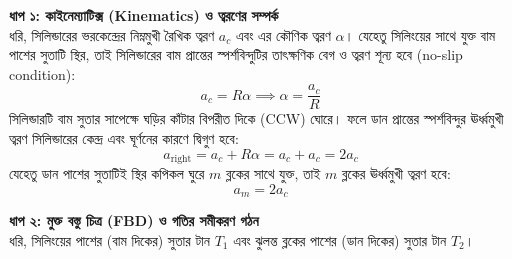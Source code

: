 \documentclass[12pt, a4paper]{article}
\begin{document}
\begin{tcolorbox}[solutionbox={সমাধান (Solution)}]
\noindent
\textbf{ধাপ ১: কাইনেম্যাটিক্স (Kinematics) ও ত্বরণের সম্পর্ক} \\
ধরি, সিলিন্ডারের ভরকেন্দ্রের নিম্নমুখী রৈখিক ত্বরণ $a_c$ এবং এর কৌণিক ত্বরণ $\alpha$। 
যেহেতু সিলিংয়ের সাথে যুক্ত বাম পাশের সুতাটি স্থির, তাই সিলিন্ডারের বাম প্রান্তের স্পর্শবিন্দুটির তাৎক্ষণিক বেগ ও ত্বরণ শূন্য হবে (no-slip condition):
$$a_c = R \alpha \implies \alpha = \frac{a_c}{R}$$
সিলিন্ডারটি বাম সুতার সাপেক্ষে ঘড়ির কাঁটার বিপরীত দিকে (CCW) ঘোরে। ফলে ডান প্রান্তের স্পর্শবিন্দুর ঊর্ধ্বমুখী ত্বরণ সিলিন্ডারের কেন্দ্র এবং ঘূর্ণনের কারণে দ্বিগুণ হবে:
$$a_{\text{right}} = a_c + R\alpha = a_c + a_c = 2a_c$$
যেহেতু ডান পাশের সুতাটিই স্থির কপিকল ঘুরে $m$ ব্লকের সাথে যুক্ত, তাই $m$ ব্লকের ঊর্ধ্বমুখী ত্বরণ হবে:
$$a_m = 2a_c$$

\vspace{0.5em}
\noindent
\textbf{ধাপ ২: মুক্ত বস্তু চিত্র (FBD) ও গতির সমীকরণ গঠন} \\
ধরি, সিলিংয়ের পাশের (বাম দিকের) সুতার টান $T_1$ এবং ঝুলন্ত ব্লকের পাশের (ডান দিকের) সুতার টান $T_2$।

\vspace{1em}
\begin{center}
\end{center}
\end{tcolorbox}
\end{document}
